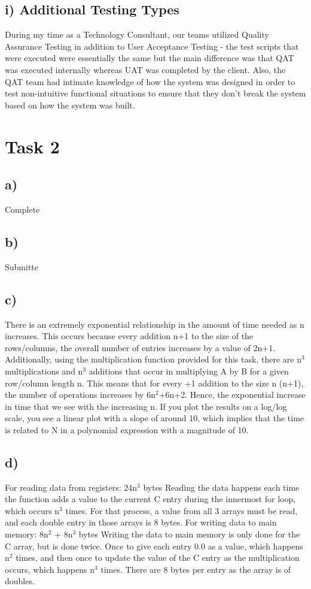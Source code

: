 \documentclass[11pt, oneside]{article}   	%
\begin{document}
\subsection*{i) Additional Testing Types}
During my time as a Technology Consultant, our teams utilized Quality Assurance Testing in addition to User Acceptance Testing - the test scripts that were executed were essentially the same but the main difference was that QAT was executed internally whereas UAT was completed by the client. Also, the QAT team had intimate knowledge of how the system was designed in order to test non-intuitive functional situations to ensure that they don't break the system based on how the system was built.

\section*{Task 2}
\subsection*{a)}
Complete
\subsection*{b)}
Submitte
\subsection*{c)}
There is an extremely exponential relationship in the amount of time needed as n increases.  This occurs because every addition n+1 to the size of the rows/columns, the overall number of entries increases by a value of 2n+1.  Additionally, using the multiplication function provided for this task, there are n$^3$ multiplications and n$^3$ additions that occur in multiplying A by B for a given row/column length n.  This means that for every +1 addition to the size n (n+1), the number of operations increases by 6n$^2$+6n+2.  Hence, the exponential increase in time that we see with the increasing n.  If you plot the results on a log/log scale, you see a linear plot with a slope of around 10, which implies that the time is related to N in a polynomial expression with a magnitude of 10.
\subsection*{d)}
For reading data from registers: 24n$^3$ bytes
\newline
Reading the data happens each time the function adds a value to the current C entry during the innermost for loop, which occurs n$^3$ times.  For that process, a value from all 3 arrays must be read, and each double entry in those arrays is 8 bytes.
\newline
\newline
For writing data to main memory: 8n$^2$ + 8n$^3$ bytes
\newline
Writing the data to main memory is only done for the C array, but is done twice.  Once to give each entry 0.0 as a value, which happens n$^2$ times, and then once to update the value of the C entry as the multiplication occurs, which happens n$^3$ times.  There are 8 bytes per entry as the array is of doubles.
\end{document}
